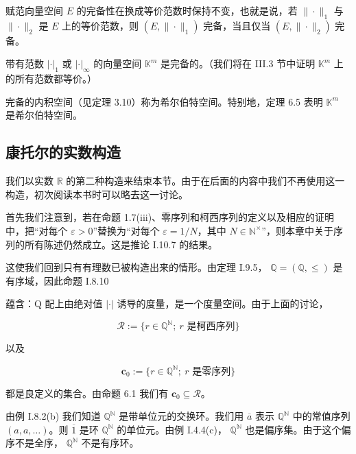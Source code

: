 \begin{remark}

\begin{items}
\item

赋范向量空间  $ E $ 的完备性在换成等价范数时保持不变，也就是说，若  $ \|\cdot\|_1 $ 与  $ \|\cdot\|_2 $ 是  $ E $ 上的等价范数，则  $ (E, \|\cdot\|_1) $ 完备，当且仅当  $ (E, \|\cdot\|_2) $ 完备。

\item

带有范数  $ |\cdot|_1 $ 或  $ |\cdot|_{\infty} $ 的向量空间  $ \mathbb{K}^m $ 是完备的。（我们将在 III.3 节中证明  $ \mathbb{K}^m $ 上的所有范数都等价。）

\item

完备的内积空间（见定理 3.10）称为希尔伯特空间。特别地，定理 6.5 表明  $ \mathbb{K}^m $ 是希尔伯特空间。

\end{items}

\end{remark}

\subsection*{康托尔的实数构造}

我们以实数  $ \mathbb{R} $ 的第二种构造来结束本节。由于在后面的内容中我们不再使用这一构造，初次阅读本书时可以略去这一讨论。

首先我们注意到，若在命题 1.7(iii)、零序列和柯西序列的定义以及相应的证明中，把“对每个  $ \varepsilon > 0 $”替换为“对每个  $ \varepsilon = 1/N $，其中  $ N \in \mathbb{N}^\times $”，则本章中关于序列的所有陈述仍然成立。这是推论 I.10.7 的结果。

这使我们回到只有有理数已被构造出来的情形。由定理 I.9.5， $ \mathbb{Q} = (\mathbb{Q}, \leq) $ 是有序域，因此命题 I.8.10

蕴含：Q 配上由绝对值  $ |\cdot| $ 诱导的度量，是一个度量空间。由于上面的讨论，

\[
\mathcal{R}:=\big\{r\in\mathbb{Q}^{\mathbb{N}};~r\text{ 是柯西序列}\big\}
\]

以及

\[
\mathbf{c}_{0}:=\{r\in\mathbb{Q}^{\mathbb{N}};~r\text{ 是零序列}\}
\]

都是良定义的集合。由命题 6.1 我们有  $ \mathbf{c}_0 \subseteq \mathcal{R} $。

由例 I.8.2(b) 我们知道  $ \mathbb{Q}^{\mathbb{N}} $ 是带单位元的交换环。我们用  $ \overline{a} $ 表示  $ \mathbb{Q}^{\mathbb{N}} $ 中的常值序列  $ (a, a, \ldots) $。则  $ \overline{1} $ 是环  $ \mathbb{Q}^{\mathbb{N}} $ 的单位元。由例 I.4.4(c)， $ \mathbb{Q}^{\mathbb{N}} $ 也是偏序集。由于这个偏序不是全序， $ \mathbb{Q}^{\mathbb{N}} $ 不是有序环。

